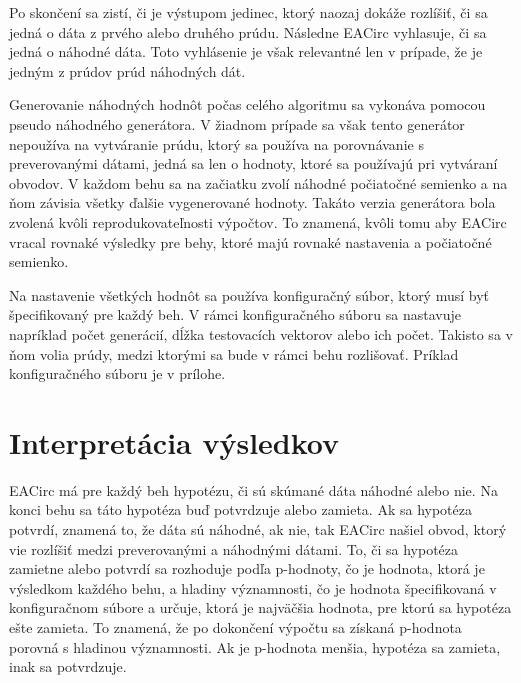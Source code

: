 Po skončení sa zistí, či je výstupom jedinec, ktorý naozaj dokáže rozlíšiť, či sa jedná o dáta z prvého alebo druhého prúdu. Následne EACirc vyhlasuje, či sa jedná o náhodné dáta. Toto vyhlásenie je však relevantné len v prípade, že je jedným z prúdov prúd náhodných dát. 

Generovanie náhodných hodnôt počas celého algoritmu sa vykonáva pomocou pseudo náhodného generátora. V žiadnom prípade sa však tento generátor nepoužíva na vytváranie prúdu, ktorý sa používa na porovnávanie s preverovanými dátami, jedná sa len o hodnoty, ktoré sa používajú pri vytváraní obvodov. V každom behu sa na začiatku zvolí náhodné počiatočné semienko a na ňom závisia všetky ďalšie vygenerované hodnoty. Takáto verzia generátora bola zvolená kvôli reprodukovateľnosti výpočtov. To znamená, kvôli tomu aby EACirc vracal rovnaké výsledky pre behy, ktoré majú rovnaké nastavenia a počiatočné semienko.

Na nastavenie všetkých hodnôt sa používa konfiguračný súbor, ktorý musí byť špecifikovaný pre každý beh. V rámci konfiguračného súboru sa nastavuje napríklad počet generácií, dĺžka testovacích vektorov alebo ich počet. Takisto sa v ňom volia prúdy, medzi ktorými sa bude v rámci behu rozlišovať. Príklad konfiguračného súboru je v prílohe.

\section{Interpretácia výsledkov}
\label{sec:result-interpretation}

EACirc má pre každý beh hypotézu, či sú skúmané dáta náhodné alebo nie. Na konci behu sa táto hypotéza buď potvrdzuje alebo zamieta. Ak sa hypotéza potvrdí, znamená to, že dáta sú náhodné, ak nie, tak EACirc našiel obvod, ktorý vie rozlíšiť medzi preverovanými a náhodnými dátami. To, či sa hypotéza zamietne alebo potvrdí sa rozhoduje podľa p-hodnoty, čo je hodnota, ktorá je výsledkom každého behu, a hladiny významnosti, čo je hodnota špecifikovaná v konfiguračnom súbore a určuje, ktorá je najväčšia hodnota, pre ktorú sa hypotéza ešte zamieta. To znamená, že po dokončení výpočtu sa získaná p-hodnota porovná s hladinou významnosti. Ak je p-hodnota menšia, hypotéza sa zamieta, inak sa potvrdzuje. 


